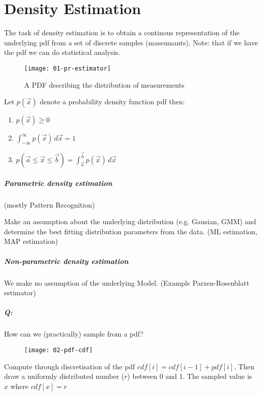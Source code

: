 
\section*{Density Estimation}
The task of density estimation is to obtain a continous representation of the underlying pdf from a set of discrete samples (massumants). Note: that if we have the pdf we can do statistical analysis.

\begin{figure}[H]
  \centering
  \texttt{[image: 01-pr-estimator]}
  \caption{A PDF describing the distribution of measurements}
\end{figure}

Let $p(\vec{x})$ denote a probability density function pdf then:

\begin{enumerate}
  \item $p(\vec{x}) \ge 0$
  \item $\int_{-\infty}^\infty p(\vec{x}) \,d\vec{x} = 1$
  \item $p(\vec{a} \le \vec{x} \le \vec{b}) = \int_{\vec{a}}^{\vec{b}} p(\vec{x}) \,d\vec{x}$
\end{enumerate}

\subparagraph{Parametric density estimation}
(mostly Pattern Recognition)

Make an assumption about the underlying distribution (e.g. Gausian, GMM) and determine the best fitting distribution parameters from the data. (ML estimation, MAP estimation)

\subparagraph{Non-parametric density estimation}

We make no assumption of the underlying Model. (Example Parzen-Rosenblatt estimator)

\subparagraph{Q:} How can we (practically) sample from a pdf?

\begin{figure}[H]
  \centering
  \texttt{[image: 02-pdf-cdf]}
\end{figure}

Compute through discretisation of the pdf $cdf[i] = cdf[i-1] + pdf[i]$. Then draw a uniformly distributed number ($r$) between 0 and 1. The sampled value is $x$ where $cdf[x] = r$
